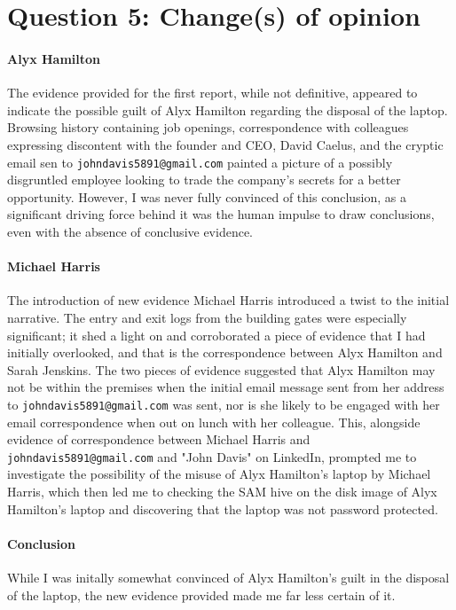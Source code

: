 \section{Question 5: Change(s) of opinion}

\paragraph{Alyx Hamilton} %
\label{par:Alyx Hamilton}
The evidence provided for the first report, while not definitive, appeared to indicate the possible guilt of Alyx Hamilton regarding the disposal of the laptop. Browsing history containing job openings, correspondence with colleagues expressing discontent with the founder and CEO, David Caelus, and the cryptic email sen to \texttt{johndavis5891@gmail.com} painted a picture of a possibly disgruntled employee looking to trade the company's secrets for a better opportunity. However, I was never fully convinced of this conclusion, as a significant driving force behind it was the human impulse to draw conclusions, even with the absence of conclusive evidence.

\paragraph{Michael Harris} %
\label{par:Michael Harris}
The introduction of new evidence Michael Harris introduced a twist to the initial narrative. The entry and exit logs from the building gates were especially significant; it shed a light on and corroborated a piece of evidence that I had initially overlooked, and that is the correspondence between Alyx Hamilton and Sarah Jenskins. The two pieces of evidence suggested that Alyx Hamilton may not be within the premises when the initial email message sent from her address to \texttt{johndavis5891@gmail.com} was sent, nor is she likely to be engaged with her email correspondence when out on lunch with her colleague. This, alongside evidence of correspondence between Michael Harris and \texttt{johndavis5891@gmail.com} and "John Davis" on LinkedIn, prompted me to investigate the possibility of the misuse of Alyx Hamilton's laptop by Michael Harris, which then led me to checking the SAM hive on the disk image of Alyx Hamilton's laptop and discovering that the laptop was not password protected.

\paragraph{Conclusion} %
\label{par:Conclusion}
While I was initally somewhat convinced of Alyx Hamilton's guilt in the disposal of the laptop, the new evidence provided made me far less certain of it.
